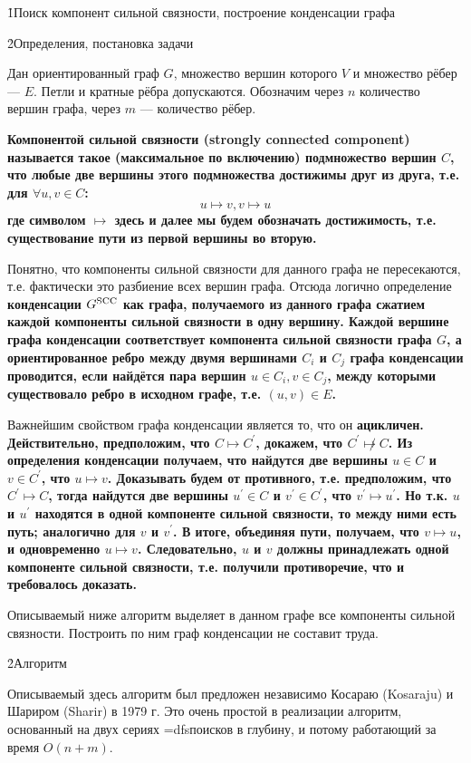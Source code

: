 \h1{Поиск компонент сильной связности, построение конденсации графа}

\h2{Определения, постановка задачи}

Дан ориентированный граф $G$, множество вершин которого $V$ и множество рёбер --- $E$. Петли и кратные рёбра допускаются. Обозначим через $n$ количество вершин графа, через $m$ --- количество рёбер.

\bf{Компонентой сильной связности} (strongly connected component) называется такое (максимальное по включению) подмножество вершин $C$, что любые две вершины этого подмножества достижимы друг из друга, т.е. для $\forall u,v \in C$:
$$ u \mapsto v, v \mapsto u $$
где символом $\mapsto$ здесь и далее мы будем обозначать достижимость, т.е. существование пути из первой вершины во вторую.

Понятно, что компоненты сильной связности для данного графа не пересекаются, т.е. фактически это разбиение всех вершин графа. Отсюда логично определение \bf{конденсации} $G^{\rm SCC}$ как графа, получаемого из данного графа сжатием каждой компоненты сильной связности в одну вершину. Каждой вершине графа конденсации соответствует компонента сильной связности графа $G$, а ориентированное ребро между двумя вершинами $C_i$ и $C_j$ графа конденсации проводится, если найдётся пара вершин $u \in C_i, v \in C_j$, между которыми существовало ребро в исходном графе, т.е. $(u,v) \in E$.

Важнейшим свойством графа конденсации является то, что он \bf{ацикличен}. Действительно, предположим, что $C \mapsto C^\prime$, докажем, что $C^\prime \not\mapsto C$. Из определения конденсации получаем, что найдутся две вершины $u \in C$ и $v \in C^\prime$, что $u \mapsto v$. Доказывать будем от противного, т.е. предположим, что $C^\prime \mapsto C$, тогда найдутся две вершины $u^\prime \in C$ и $v^\prime \in C^\prime$, что $v^\prime \mapsto u^\prime$. Но т.к. $u$ и $u^\prime$ находятся в одной компоненте сильной связности, то между ними есть путь; аналогично для $v$ и $v^\prime$. В итоге, объединяя пути, получаем, что $v \mapsto u$, и одновременно $u \mapsto v$. Следовательно, $u$ и $v$ должны принадлежать одной компоненте сильной связности, т.е. получили противоречие, что и требовалось доказать.

Описываемый ниже алгоритм выделяет в данном графе все компоненты сильной связности. Построить по ним граф конденсации не составит труда.

\h2{Алгоритм}

Описываемый здесь алгоритм был предложен независимо Косараю (Kosaraju) и Шариром (Sharir) в 1979 г. Это очень простой в реализации алгоритм, основанный на двух сериях \algohref=dfs{поисков в глубину}, и потому работающий за время $O(n+m)$.

